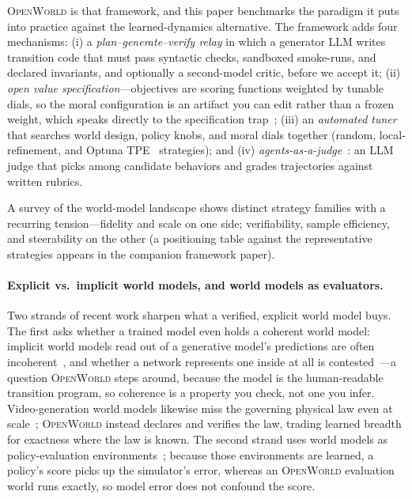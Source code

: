 \documentclass[11pt]{article}
\newcommand{\openworld}{\textsc{OpenWorld}}
\begin{document}
\openworld{} is that framework, and this paper benchmarks the paradigm it
puts into practice against the learned-dynamics alternative. The framework
adds four mechanisms: (i) a \emph{plan--generate--verify relay} in
which a generator LLM writes transition code that must pass syntactic
checks, sandboxed smoke-runs, and declared invariants, and optionally a
second-model critic, before we accept it; (ii) \emph{open value
specification}---objectives are scoring functions weighted by tunable dials,
so the moral configuration is an artifact you can edit rather than a frozen weight,
which speaks directly to the specification trap~\cite{spectrap2025}; (iii) an
\emph{automated tuner} that searches world design, policy knobs, and moral
dials together (random, local-refinement, and Optuna TPE~\cite{optuna2019}
strategies); and (iv) \emph{agents-as-a-judge}~\cite{agentasjudge2024,
llmjudge2023}: an LLM judge that picks among candidate behaviors and grades
trajectories against written rubrics.

A survey of the world-model landscape shows distinct strategy families with
a recurring tension---fidelity and scale on one side; verifiability, sample
efficiency, and steerability on the other (a positioning table against the
representative strategies appears in the companion framework paper).

\paragraph{Explicit vs.\ implicit world models, and world models as evaluators.}
Two strands of recent work sharpen what a verified, explicit world model buys. The first
asks whether a trained model even holds a coherent world model: implicit world models
read out of a generative model's predictions are often incoherent~\cite{vafa2024evaluating},
and whether a network represents one inside at all is contested~\cite{li2025what}---a
question \openworld{} steps around, because the model is the human-readable transition program,
so coherence is a property you check, not one you infer. Video-generation world models
likewise miss the governing physical law even at scale~\cite{kang2024how}; \openworld{}
instead declares and verifies the law, trading learned breadth for exactness where the law is
known. The second strand uses world models as policy-evaluation
environments~\cite{quevedo2025worldgym}; because those environments are learned, a policy's
score picks up the simulator's error, whereas an \openworld{} evaluation world runs
exactly, so model error does not confound the score.
\end{document}
